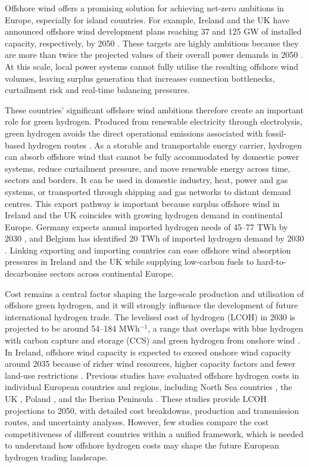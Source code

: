 \documentclass[pdflatex,lineno,sn-mathphys,Numbered]{sn-jnl}%
\begin{document}
Offshore wind offers a promising solution for achieving net-zero ambitions in Europe,
especially for island countries. For example, Ireland and the UK have announced
offshore wind development plans reaching 37 and 125 GW of installed capacity,
respectively, by 2050 \cite{FutureFrameworkfor, Offshorewindnetzero}. These targets
are highly ambitious because they are more than twice the projected values of their
overall power demands in 2050 \cite{TenYearGenerationCapacity, FES}. At this scale,
local power systems cannot fully utilise the resulting offshore wind volumes, leaving
surplus generation that increases connection bottlenecks, curtailment risk and
real-time balancing pressures.

These countries' significant offshore wind ambitions therefore create an important
role for green hydrogen. Produced from renewable electricity through electrolysis,
green hydrogen avoids the direct operational emissions associated with fossil-based
hydrogen routes \cite{Comparisonoftheemissions}. As a storable and transportable
energy carrier, hydrogen can absorb offshore wind that cannot be fully accommodated
by domestic power systems, reduce curtailment pressure, and move renewable energy
across time, sectors and borders. It can be used in domestic industry, heat, power
and gas systems, or transported through shipping and gas networks to distant demand
centres. This export pathway is important because surplus offshore wind in Ireland
and the UK coincides with growing hydrogen demand in continental Europe. Germany
expects annual imported hydrogen needs of 45--77 TWh by 2030
\cite{TheNationalHydrogenStrategy, HydrogenWhichimport}, and Belgium has identified
20 TWh of imported hydrogen demand by 2030 \cite{BelgianfederalHydrogenStrategy}.
Linking exporting and importing countries can ease offshore wind absorption pressures
in Ireland and the UK while supplying low-carbon fuels to hard-to-decarbonise sectors
across continental Europe.

Cost remains a central factor shaping the large-scale production and utilisation
of offshore green hydrogen, and it will strongly influence the development of
future international hydrogen trade. The levelised cost of hydrogen (LCOH) in
2030 is projected to be around 54--184 \texteuro{} MWh$^{-1}$, a range that overlaps with blue
hydrogen with carbon capture and storage (CCS) and green hydrogen from onshore
wind \cite{GlobalHydrogenReview2023}. In Ireland, offshore wind capacity is
expected to exceed onshore wind capacity around 2035 because of richer wind
resources, higher capacity factors and fewer land-use restrictions
\cite{windenergyroadmap}. Previous studies have evaluated offshore hydrogen
costs in individual European countries and regions, including North Sea countries
\cite{rogeau2023techno}, the UK \cite{giampieri2024techno}, Poland
\cite{komorowska2023evaluating}, and the Iberian Peninsula
\cite{gonzalez2024techno, calado2024assessment}. These studies provide LCOH
projections to 2050, with detailed cost breakdowns, production and transmission
routes, and uncertainty analyses. However, few studies compare the cost
competitiveness of different countries within a unified framework, which is
needed to understand how offshore hydrogen costs may shape the future European
hydrogen trading landscape.
\end{document}
